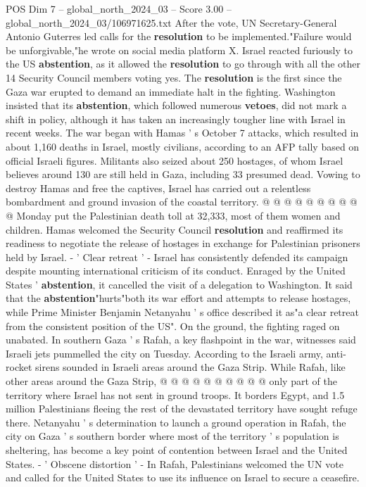 \begin{textsample}{POS Dim 7 – global\_north\_2024\_03 – Score 3.00 – global\_north\_2024\_03/106971625.txt}  \label{ex:f7_pos_212}
After the vote, UN Secretary-General Antonio Guterres led calls for the \textbf{resolution} to be implemented."Failure would be unforgivable,"he wrote on social media platform X.
Israel reacted furiously to the US \textbf{abstention}, as it allowed the \textbf{resolution} to go through with all the other 14 Security Council members voting yes.
The \textbf{resolution} is the first since the Gaza war erupted to demand an immediate halt in the fighting.
Washington insisted that its \textbf{abstention}, which followed numerous \textbf{vetoes}, did not mark a shift in policy, although it has taken an increasingly tougher line with Israel in recent weeks.
The war began with Hamas ' s October 7 attacks, which resulted in about 1,160 deaths in Israel, mostly civilians, according to an AFP tally based on official Israeli figures.
Militants also seized about 250 hostages, of whom Israel believes around 130 are still held in Gaza, including 33 presumed dead.
Vowing to destroy Hamas and free the captives, Israel has carried out a relentless bombardment and ground invasion of the coastal territory. @ @ @ @ @ @ @ @ @ @ Monday put the Palestinian death toll at 32,333, most of them women and children.
Hamas welcomed the Security Council \textbf{resolution} and reaffirmed its readiness to negotiate the release of hostages in exchange for Palestinian prisoners held by Israel. - ' Clear retreat ' - Israel has consistently defended its campaign despite mounting international criticism of its conduct.
Enraged by the United States ' \textbf{abstention}, it cancelled the visit of a delegation to Washington.
It said that the \textbf{abstention}"hurts"both its war effort and attempts to release hostages, while Prime Minister Benjamin Netanyahu ' s office described it as"a clear retreat from the consistent position of the US".
On the ground, the fighting raged on unabated.
In southern Gaza ' s Rafah, a key flashpoint in the war, witnesses said Israeli jets pummelled the city on Tuesday.
According to the Israeli army, anti-rocket sirens sounded in Israeli areas around the Gaza Strip.
While Rafah, like other areas around the Gaza Strip, @ @ @ @ @ @ @ @ @ @ only part of the territory where Israel has not sent in ground troops.
It borders Egypt, and 1.5 million Palestinians fleeing the rest of the devastated territory have sought refuge there.
Netanyahu ' s determination to launch a ground operation in Rafah, the city on Gaza ' s southern border where most of the territory ' s population is sheltering, has become a key point of contention between Israel and the United States. - ' Obscene distortion ' - In Rafah, Palestinians welcomed the UN vote and called for the United States to use its influence on Israel to secure a ceasefire.

\end{textsample}
